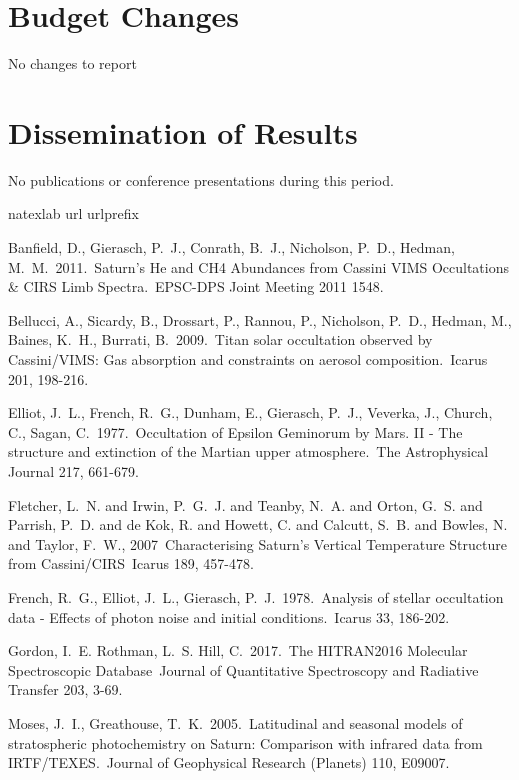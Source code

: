 \documentclass[12pt]{article}
\begin{document}
\section{Budget Changes}

No changes to report

\section{Dissemination of Results}

No publications or conference presentations during this period.

\begin{thebibliography}{28}
\expandafter\ifx\csname natexlab\endcsname\relax\def\natexlab#1{#1}\fi
\expandafter\ifx\csname url\endcsname\relax
 \def\url#1{\texttt{#1}}\fi
\expandafter\ifx\csname urlprefix\endcsname\relax\def\urlprefix{URL }\fi
\providecommand{\eprint}[2][]{\url{#2}}

 Banfield, D., Gierasch, P.~J.,
Conrath, B.~J., Nicholson, P.~D., Hedman, M.~M.\ 2011.\ Saturn's He and CH4
Abundances from Cassini VIMS Occultations \& CIRS Limb Spectra.\ EPSC-DPS
Joint Meeting 2011 1548.

 Bellucci, A., Sicardy, B., Drossart, P.,
Rannou, P., Nicholson, P.~D., Hedman, M., Baines, K.~H., Burrati, B.\ 2009.\
Titan solar occultation observed by Cassini/VIMS: Gas absorption and
constraints on aerosol composition.\ Icarus 201, 198-216.

 Elliot, J.~L., French, R.~G.,
Dunham, E., Gierasch, P.~J., Veverka, J., Church, C., Sagan, C.\ 1977.\ Occultation
of Epsilon Geminorum by Mars. II - The structure and extinction of the Martian
upper atmosphere.\ The Astrophysical Journal 217, 661-679.

 {Fletcher}, L.~N. and {Irwin},
P.~G.~J. and {Teanby}, N.~A. and {Orton}, G.~S. and {Parrish}, P.~D. and {de
Kok}, R. and {Howett}, C. and {Calcutt}, S.~B. and {Bowles}, N. and {Taylor},
F.~W., 2007\ Characterising Saturn's Vertical Temperature Structure from
Cassini/CIRS\ Icarus 189, 457-478.

 French, R.~G., Elliot, J.~L.,
Gierasch, P.~J.\ 1978.\ Analysis of stellar occultation data - Effects of
photon noise and initial conditions.\ Icarus 33, 186-202.

 {Gordon}, I.~E. {Rothman}, L.~S.
{Hill}, C.\ 2017.\ The HITRAN2016 Molecular Spectroscopic Database\ Journal of
Quantitative Spectroscopy and Radiative Transfer 203, 3-69.

 Moses, J.~I., Greathouse, T.~K.\
2005.\ Latitudinal and seasonal models of stratospheric photochemistry on
Saturn: Comparison with infrared data from IRTF/TEXES.\ Journal of
Geophysical Research (Planets) 110, E09007.

\end{thebibliography}
\end{document}
